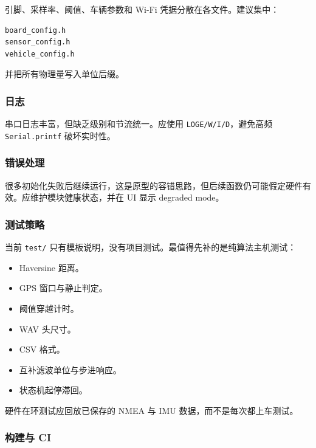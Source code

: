 \documentclass[
  UTF8,11pt,a4paper]{ctexart}
\newcommand{\passthrough}[1]{#1}
\providecommand{\tightlist}{%
  \setlength{\itemsep}{0pt}\setlength{\parskip}{0pt}}
\begin{document}
引脚、采样率、阈值、车辆参数和 Wi-Fi 凭据分散在各文件。建议集中：

\begin{lstlisting}
board_config.h
sensor_config.h
vehicle_config.h
\end{lstlisting}

并把所有物理量写入单位后缀。

\subsubsection{日志}\label{ux65e5ux5fd7}

串口日志丰富，但缺乏级别和节流统一。应使用
\passthrough{\lstinline!LOGE/W/I/D!}，避免高频
\passthrough{\lstinline!Serial.printf!} 破坏实时性。

\subsubsection{错误处理}\label{ux9519ux8befux5904ux7406}

很多初始化失败后继续运行，这是原型的容错思路，但后续函数仍可能假定硬件有效。应维护模块健康状态，并在
UI 显示 degraded mode。

\subsubsection{测试策略}\label{ux6d4bux8bd5ux7b56ux7565}

当前 \passthrough{\lstinline!test/!}
只有模板说明，没有项目测试。最值得先补的是纯算法主机测试：

\begin{itemize}
\tightlist
\item
  Haversine 距离。
\item
  GPS 窗口与静止判定。
\item
  阈值穿越计时。
\item
  WAV 头尺寸。
\item
  CSV 格式。
\item
  互补滤波单位与步进响应。
\item
  状态机起停滞回。
\end{itemize}

硬件在环测试应回放已保存的 NMEA 与 IMU 数据，而不是每次都上车测试。

\subsubsection{构建与 CI}\label{ux6784ux5efaux4e0e-ci}
\end{document}
